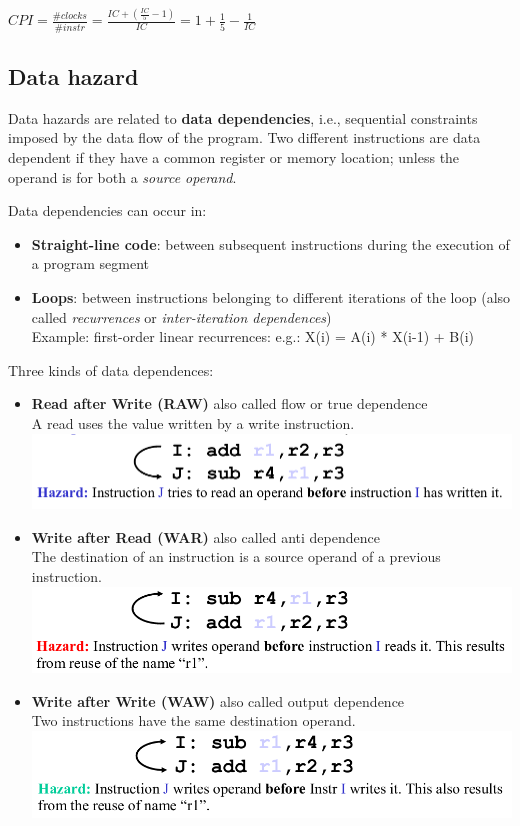 $CPI = \frac{\#clocks}{\#instr} = \frac{IC + (\frac{IC}{5} - 1)}{IC} = 1 + \frac{1}{5} - \frac{1}{IC}$

\subsection{Data hazard}
Data hazards are related to \textbf{data dependencies}, i.e., sequential constraints imposed by the data flow of the program.
Two different instructions are data dependent if they have a common register or memory location; unless the operand is for both a \textit{source operand}.

Data dependencies can occur in:
\begin{itemize}
    \item \textbf{Straight-line code}: between subsequent instructions during the execution of a program segment
    \item \textbf{Loops}: between instructions belonging to different iterations of the loop (also called \textit{recurrences} or \textit{inter-iteration dependences})\\
Example: first-order linear recurrences: e.g.: X(i) = A(i) * X(i-1) + B(i)
\end{itemize}

Three kinds of data dependences:
\begin{itemize}
    \item \textbf{Read after Write (RAW)} also called flow or true dependence\\
    A read uses the value written by a write instruction.\\
    \includegraphics[width=\textwidth]{images/RAW_scheme.png}
    
    \item \textbf{Write after Read (WAR)} also called anti dependence\\
    The destination of an instruction is a source operand of a previous instruction.\\
    \includegraphics[width=\textwidth]{images/WAR_scheme.png}
    
    \item \textbf{Write after Write (WAW)} also called output dependence\\
    Two instructions have the same destination operand.\\
    \includegraphics[width=\textwidth]{images/WAW_scheme.png}
\end{itemize}

